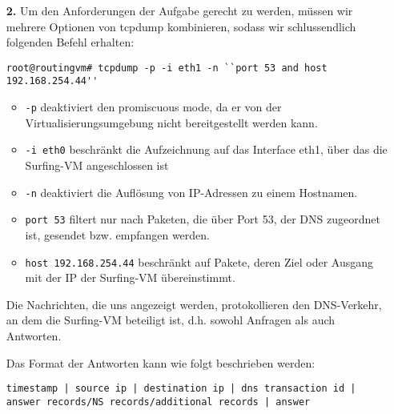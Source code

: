 \documentclass[10pt,a4paper]{article}
\begin{document}
\begin{enumerate}
        \item[\bf 2.] Um den Anforderungen der Aufgabe gerecht zu werden, müssen
                      wir mehrere Optionen von tcpdump kombinieren, sodass wir
                      schlussendlich folgenden Befehl erhalten:
                      \begin{lstlisting}[style=BashInputStyle]
root@routingvm# tcpdump -p -i eth1 -n ``port 53 and host 192.168.254.44''
                      \end{lstlisting}

                      \begin{itemize}
                          \item \texttt{-p} deaktiviert den promiscuous mode, da
                                er von der Virtualisierungsumgebung nicht
                                bereitgestellt werden kann.
                          \item \texttt{-i eth0} beschränkt die Aufzeichnung
                                auf das Interface eth1, über das die Surfing-VM
                                angeschlossen ist
                          \item \texttt{-n} deaktiviert die Auflösung von IP-Adressen
                                zu einem Hostnamen.
                          \item \texttt{port 53} filtert nur nach Paketen, die
                                über Port 53, der DNS zugeordnet ist, gesendet bzw.
                                empfangen werden.
                          \item \texttt{host 192.168.254.44} beschränkt auf Pakete,
                                deren Ziel oder Ausgang mit der IP der Surfing-VM
                                übereinstimmt.
                      \end{itemize}

                      Die Nachrichten, die uns angezeigt werden, protokollieren
                      den DNS-Verkehr, an dem die Surfing-VM beteiligt ist, d.h.
                      sowohl Anfragen als auch Antworten.

                      Das Format der Antworten kann wie folgt beschrieben werden:

                      \texttt{timestamp | source ip | destination ip | dns transaction id | answer records/NS records/additional records | answer}


\end{enumerate}
\end{document}
